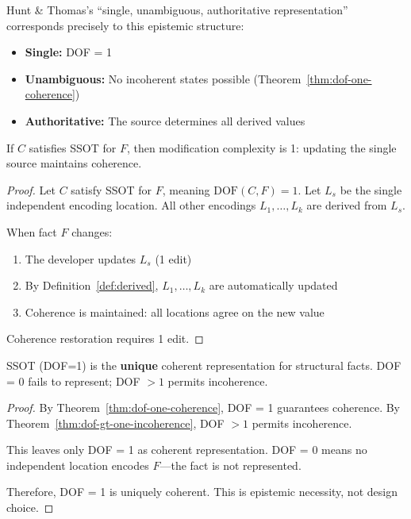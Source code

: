 Hunt \& Thomas's ``single, unambiguous, authoritative representation''~\cite{hunt1999pragmatic} corresponds precisely to this epistemic structure:
\begin{itemize}
\tightlist
\item \textbf{Single:} DOF = 1
\item \textbf{Unambiguous:} No incoherent states possible (Theorem~\ref{thm:dof-one-coherence})
\item \textbf{Authoritative:} The source determines all derived values
\end{itemize}

\begin{theorem}\label{thm:ssot-optimal}
If $C$ satisfies SSOT for $F$, then modification complexity is 1: updating the single source maintains coherence.
\end{theorem}

\begin{proof}
Let $C$ satisfy SSOT for $F$, meaning $\text{DOF}(C, F) = 1$. Let $L_s$ be the single independent encoding location. All other encodings $L_1, \ldots, L_k$ are derived from $L_s$.

When fact $F$ changes:
\begin{enumerate}
\tightlist
\item The developer updates $L_s$ (1 edit)
\item By Definition~\ref{def:derived}, $L_1, \ldots, L_k$ are automatically updated
\item Coherence is maintained: all locations agree on the new value
\end{enumerate}

Coherence restoration requires 1 edit.
\end{proof}

\begin{theorem}\label{thm:ssot-unique}
SSOT (DOF=1) is the \textbf{unique} coherent representation for structural facts. DOF = 0 fails to represent; DOF $> 1$ permits incoherence.
\end{theorem}

\begin{proof}
By Theorem~\ref{thm:dof-one-coherence}, DOF = 1 guarantees coherence.
By Theorem~\ref{thm:dof-gt-one-incoherence}, DOF $> 1$ permits incoherence.

This leaves only DOF = 1 as coherent representation. DOF = 0 means no independent location encodes $F$---the fact is not represented.

Therefore, DOF = 1 is uniquely coherent. This is epistemic necessity, not design choice.
\end{proof}

